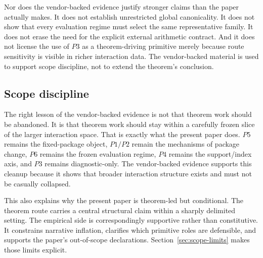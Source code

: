 Nor does the vendor-backed evidence justify stronger claims than the paper
actually makes. It does not establish unrestricted global canonicality. It does
not show that every evaluation regime must select the same representative
family. It does not erase the need for the explicit external arithmetic
contract. And it does not license the use of \(P3\) as a theorem-driving
primitive merely because route sensitivity is visible in richer interaction
data. The vendor-backed material is used to support scope discipline, not to
extend the theorem's conclusion.

\subsection*{Scope discipline}

The right lesson of the vendor-backed evidence is not that theorem work should
be abandoned. It is that theorem work should stay within a carefully frozen
slice of the larger interaction space. That is exactly what the present paper
does. \(P5\) remains the fixed-package object, \(P1/P2\) remain the mechanisms of
package change, \(P6\) remains the frozen evaluation regime, \(P4\) remains the
support/index axis, and \(P3\) remains diagnostic-only. The vendor-backed
evidence supports this cleanup because it shows that broader interaction
structure exists and must not be casually collapsed.

This also explains why the present paper is theorem-led but conditional. The
theorem route carries a central structural claim within a sharply delimited
setting. The empirical side is correspondingly
supportive rather than constitutive. It constrains narrative inflation,
clarifies which primitive roles are defensible, and supports the paper's
out-of-scope declarations. Section~\ref{sec:scope-limits} makes those limits
explicit.
